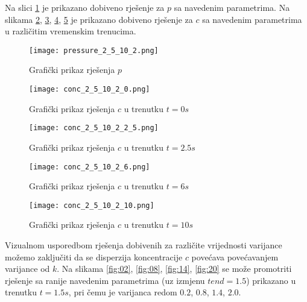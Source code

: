 \documentclass[a4paper,12pt]{article}
\begin{document}
Na slici \ref{fig:p} je prikazano dobiveno rješenje za $p$ sa navedenim parametrima. Na slikama \ref{fig:c0}, \ref{fig:c25}, \ref{fig:c6}, \ref{fig:c10} je prikazano dobiveno rješenje za $c$ sa navedenim parametrima u različitim vremenskim trenucima.

\begin{figure}[h!t]
\begin{center}
\texttt{[image: pressure\_2\_5\_10\_2.png]}
\caption{Grafički prikaz rješenja $p$}
\label{fig:p}
\end{center}
\end{figure}

\begin{figure}[h!t]
\begin{center}
\texttt{[image: conc\_2\_5\_10\_2\_0.png]}
\caption{Grafički prikaz rješenja $c$ u trenutku $t = 0s$}
\label{fig:c0}
\end{center}
\end{figure}

\begin{figure}[h!t]
\begin{center}
\texttt{[image: conc\_2\_5\_10\_2\_2\_5.png]}
\caption{Grafički prikaz rješenja $c$ u trenutku $t = 2.5s$}
\label{fig:c25}
\end{center}
\end{figure}

\begin{figure}[h!t]
\begin{center}
\texttt{[image: conc\_2\_5\_10\_2\_6.png]}
\caption{Grafički prikaz rješenja $c$ u trenutku $t = 6s$}
\label{fig:c6}
\end{center}
\end{figure}

\begin{figure}[h!t]
\begin{center}
\texttt{[image: conc\_2\_5\_10\_2\_10.png]}
\caption{Grafički prikaz rješenja $c$ u trenutku $t = 10s$}
\label{fig:c10}
\end{center}
\end{figure}

Vizualnom usporedbom rješenja dobivenih za različite vrijednosti varijance možemo zaključiti da se disperzija koncentracije $c$ povećava povećavanjem varijance od $k$. Na slikama \ref{fig:02}, \ref{fig:08}, \ref{fig:14}, \ref{fig:20} se može promotriti rješenje sa ranije navedenim parametrima (uz izmjenu $tend = 1.5$) prikazano u trenutku $t = 1.5s$, pri čemu je varijanca redom $0.2$, $0.8$, $1.4$, $2.0$.
\end{document}
